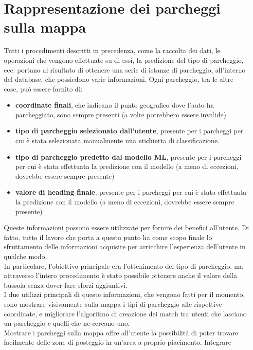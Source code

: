 \chapter{Rappresentazione dei parcheggi sulla mappa}

Tutti i procedimenti descritti in precedenza, come la raccolta dei dati, le
operazioni che vengono effettuate su di essi, la predizione del tipo di 
parcheggio, ecc. portano al risultato di ottenere una serie di istanze
di parcheggio, all'interno del database, che possiedono varie informazioni.
Ogni parcheggio, tra le altre cose, può essere fornito di:
\begin{itemize}
    \item \textbf{coordinate finali}, che indicano il punto geografico dove l'auto ha 
    parcheggiato, sono sempre presenti (a volte potrebbero essere invalide)
    \item \textbf{tipo di parcheggio selezionato dall'utente}, presente per i parcheggi
    per cui è stata selezionata manualmente una etichietta di classificazione.
    \item \textbf{tipo di parcheggio predetto dal modello ML}, presente per i parcheggi
    per cui è stata effettuata la predizione con il modello (a meno di eccezioni, dovrebbe
    essere sempre presente)
    \item \textbf{valore di heading finale}, presente per i parcheggi
    per cui è stata effettuata la predizione con il modello (a meno di eccezioni, dovrebbe
    essere sempre presente)
\end{itemize}
Queste informazioni possono essere utilizzate per fornire dei benefici all'utente.
Di fatto, tutto il lavoro che porta a questo punto ha come scopo finale lo 
sfruttamento delle informazioni acquisite per arricchire l'esperienza 
dell'utente in qualche modo.\\
In particolare, l'obiettivo principale era l'ottenimento del tipo di parcheggio, ma 
attraverso l'intero procedimento è stato possibile ottenere anche il valore della 
bussola senza dover fare sforzi aggiuntivi.\\
I due utilizzi principali di queste informazioni, che vengono fatti per il momento, sono
mostrare visivamente sulla mappa i tipi di parcheggio alle rispettive coordinate, e
migliorare l'algoritmo di creazione dei match tra utenti che lasciano un parcheggio e 
quelli che ne cercano uno.\\
Mostrare i parcheggi sulla mappa offre all'utente la possibilità di poter trovare 
facilmente delle zone di posteggio in un'area a proprio piacimento. Integrare
